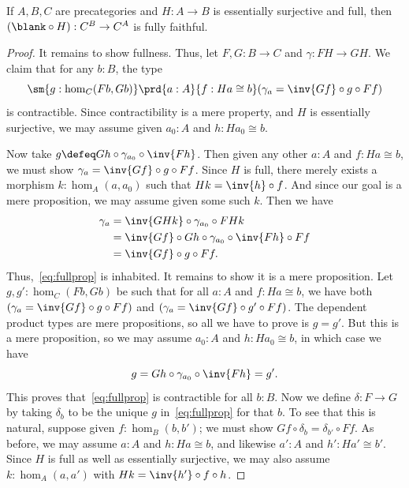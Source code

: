 %
\begin{lem}\label{ct:esofull-precomp-ff}
  If $A,B,C$ are precategories and $H:A\to B$ is essentially surjective and full, then $(\blank\circ H):C^B \to C^A$ is fully faithful.
\end{lem}

\begin{proof}
  It remains to show fullness.
  Thus, let $F,G:B\to C$ and $\gamma:FH \to GH$.
  We claim that for any $b:B$, the type
  \begin{equation}\label{eq:fullprop}
    \sm{g:\hom_C(Fb,Gb)} \prd{a:A}{f:Ha\cong b} (\gamma_a =  \inv{Gf}\circ g\circ Ff)
  \end{equation}
  is contractible.
  Since contractibility is a mere property, and $H$ is essentially surjective, we may assume given $a_0:A$ and $h:Ha_0\cong b$.

  Now take $g\defeq Gh \circ \gamma_{a_0} \circ \inv{Fh}$.
  Then given any other $a:A$ and $f:Ha\cong b$, we must show $\gamma_a =  \inv{Gf}\circ g\circ Ff$.
  Since $H$ is full, there merely exists a morphism $k:\hom_A(a,a_0)$ such that $Hk = \inv{h}\circ f$.
  And since our goal is a mere proposition, we may assume given some such $k$.
  Then we have
  \begin{align*}
    \gamma_a &= \inv{GHk}\circ \gamma_{a_0} \circ FHk\\
    &= \inv{Gf} \circ Gh \circ \gamma_{a_0} \circ \inv{Fh} \circ Ff\\
    &= \inv{Gf}\circ g\circ Ff.
  \end{align*}
  Thus,~\eqref{eq:fullprop} is inhabited.
  It remains to show it is a mere proposition.
  Let $g,g':\hom_C(Fb, Gb)$ be such that for all $a:A$ and $f:Ha\cong b$, we have both $(\gamma_a =  \inv{Gf}\circ g\circ Ff)$ and $(\gamma_a =  \inv{Gf}\circ g'\circ Ff)$.
  The dependent product types are mere propositions, so all we have to prove is $g=g'$.
  But this is a mere proposition, so we may assume $a_0:A$ and $h:Ha_0\cong b$, in which case we have
  \[ g = Gh \circ \gamma_{a_0} \circ \inv{Fh} = g'.\]
  This proves that~\eqref{eq:fullprop} is contractible for all $b:B$.
  Now we define $\delta:F\to G$ by taking $\delta_b$ to be the unique $g$ in~\eqref{eq:fullprop} for that $b$.
  To see that this is natural, suppose given $f:\hom_B(b,b')$; we must show $Gf \circ \delta_b = \delta_{b'}\circ Ff$.
  As before, we may assume $a:A$ and $h:Ha\cong b$, and likewise $a':A$ and $h':Ha'\cong b'$.
  Since $H$ is full as well as essentially surjective, we may also assume $k:\hom_A(a,a')$ with $Hk = \inv{h'}\circ f\circ h$.


\end{proof}
